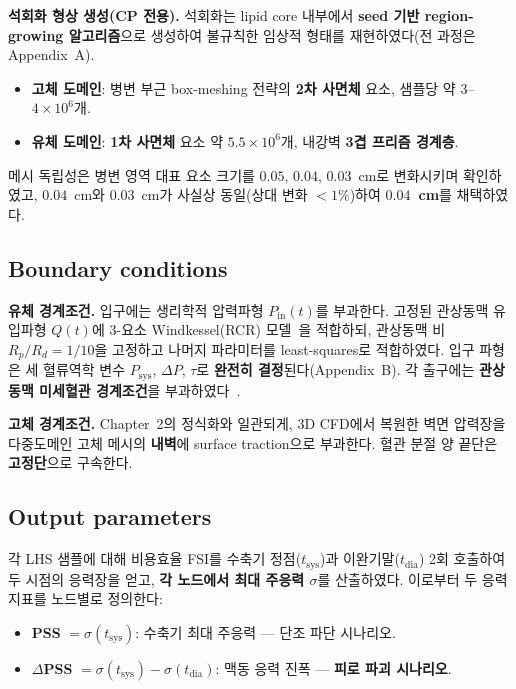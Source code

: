 \documentclass[master,english,final]{kaist-ucs}
\begin{document}
\textbf{석회화 형상 생성(CP 전용).} 석회화는 lipid core 내부에서 \textbf{seed 기반 region-growing 알고리즘}으로 생성하여 불규칙한 임상적 형태를 재현하였다(전 과정은 Appendix~A).

\begin{itemize}
\item \textbf{고체 도메인}: 병변 부근 box-meshing 전략의 \textbf{2차 사면체} 요소, 샘플당 약 $3$--$4\times10^6$개.
\item \textbf{유체 도메인}: \textbf{1차 사면체} 요소 약 $5.5\times10^6$개, 내강벽 \textbf{3겹 프리즘 경계층}.
\end{itemize}

메시 독립성은 병변 영역 대표 요소 크기를 $0.05$, $0.04$, $0.03$~cm로 변화시키며 확인하였고, $0.04$~cm와 $0.03$~cm가 사실상 동일(상대 변화 $<1\%$)하여 \textbf{$0.04$~cm}를 채택하였다.

\subsection{Boundary conditions}


\textbf{유체 경계조건.} 입구에는 생리학적 압력파형 $P_\mathrm{in}(t)$를 부과한다. 고정된 관상동맥 유입파형 $Q(t)$에 3-요소 Windkessel(RCR) 모델~\cite{westerhof2009windkessel}을 적합하되, 관상동맥 비 $R_p/R_d=1/10$을 고정하고 나머지 파라미터를 least-squares로 적합하였다. 입구 파형은 세 혈류역학 변수 $P_\mathrm{sys}$, $\Delta P$, $\tau$로 \textbf{완전히 결정}된다(Appendix~B). 각 출구에는 \textbf{관상동맥 미세혈관 경계조건}을 부과하였다~\cite{kim2010coronary, vignonclementel2006}.

\textbf{고체 경계조건.} Chapter~2의 정식화와 일관되게, 3D CFD에서 복원한 벽면 압력장을 다중도메인 고체 메시의 \textbf{내벽}에 surface traction으로 부과한다. 혈관 분절 양 끝단은 \textbf{고정단}으로 구속한다.

\subsection{Output parameters}

각 LHS 샘플에 대해 비용효율 FSI를 수축기 정점($t_\mathrm{sys}$)과 이완기말($t_\mathrm{dia}$) 2회 호출하여 두 시점의 응력장을 얻고, \textbf{각 노드에서 최대 주응력 $\sigma$}를 산출하였다. 이로부터 두 응력 지표를 노드별로 정의한다:

\begin{itemize}
\item \textbf{PSS} $=\sigma(t_\mathrm{sys})$: 수축기 최대 주응력 --- 단조 파단 시나리오.
\item \textbf{$\Delta$PSS} $=\sigma(t_\mathrm{sys})-\sigma(t_\mathrm{dia})$: 맥동 응력 진폭 --- \textbf{피로 파괴 시나리오}.
\end{itemize}
\end{document}
